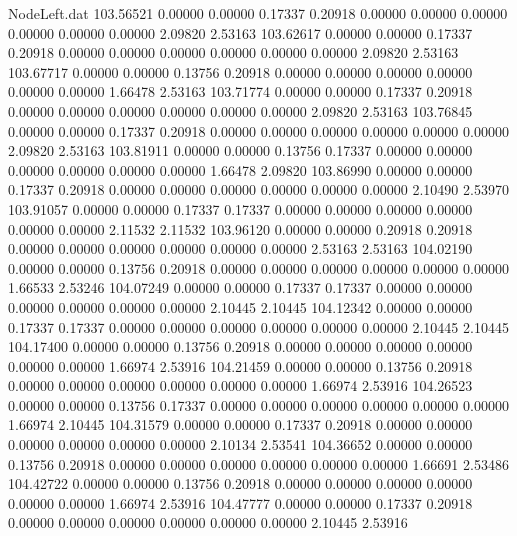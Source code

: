 \begin{filecontents}{NodeLeft.dat}
 103.56521    0.00000    0.00000     0.17337    0.20918    0.00000    0.00000    0.00000    0.00000    0.00000    0.00000    2.09820    2.53163
 103.62617    0.00000    0.00000     0.17337    0.20918    0.00000    0.00000    0.00000    0.00000    0.00000    0.00000    2.09820    2.53163
 103.67717    0.00000    0.00000     0.13756    0.20918    0.00000    0.00000    0.00000    0.00000    0.00000    0.00000    1.66478    2.53163
 103.71774    0.00000    0.00000     0.17337    0.20918    0.00000    0.00000    0.00000    0.00000    0.00000    0.00000    2.09820    2.53163
 103.76845    0.00000    0.00000     0.17337    0.20918    0.00000    0.00000    0.00000    0.00000    0.00000    0.00000    2.09820    2.53163
 103.81911    0.00000    0.00000     0.13756    0.17337    0.00000    0.00000    0.00000    0.00000    0.00000    0.00000    1.66478    2.09820
 103.86990    0.00000    0.00000     0.17337    0.20918    0.00000    0.00000    0.00000    0.00000    0.00000    0.00000    2.10490    2.53970
 103.91057    0.00000    0.00000     0.17337    0.17337    0.00000    0.00000    0.00000    0.00000    0.00000    0.00000    2.11532    2.11532
 103.96120    0.00000    0.00000     0.20918    0.20918    0.00000    0.00000    0.00000    0.00000    0.00000    0.00000    2.53163    2.53163
 104.02190    0.00000    0.00000     0.13756    0.20918    0.00000    0.00000    0.00000    0.00000    0.00000    0.00000    1.66533    2.53246
 104.07249    0.00000    0.00000     0.17337    0.17337    0.00000    0.00000    0.00000    0.00000    0.00000    0.00000    2.10445    2.10445
 104.12342    0.00000    0.00000     0.17337    0.17337    0.00000    0.00000    0.00000    0.00000    0.00000    0.00000    2.10445    2.10445
 104.17400    0.00000    0.00000     0.13756    0.20918    0.00000    0.00000    0.00000    0.00000    0.00000    0.00000    1.66974    2.53916
 104.21459    0.00000    0.00000     0.13756    0.20918    0.00000    0.00000    0.00000    0.00000    0.00000    0.00000    1.66974    2.53916
 104.26523    0.00000    0.00000     0.13756    0.17337    0.00000    0.00000    0.00000    0.00000    0.00000    0.00000    1.66974    2.10445
 104.31579    0.00000    0.00000     0.17337    0.20918    0.00000    0.00000    0.00000    0.00000    0.00000    0.00000    2.10134    2.53541
 104.36652    0.00000    0.00000     0.13756    0.20918    0.00000    0.00000    0.00000    0.00000    0.00000    0.00000    1.66691    2.53486
 104.42722    0.00000    0.00000     0.13756    0.20918    0.00000    0.00000    0.00000    0.00000    0.00000    0.00000    1.66974    2.53916
 104.47777    0.00000    0.00000     0.17337    0.20918    0.00000    0.00000    0.00000    0.00000    0.00000    0.00000    2.10445    2.53916

\end{filecontents}
